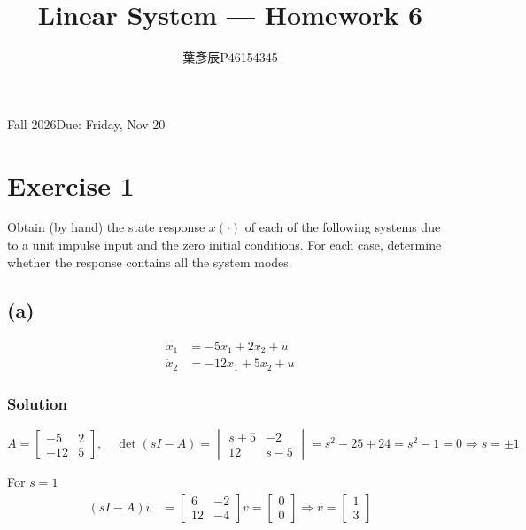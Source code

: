 \documentclass[12pt,a4paper]{article}
\title{Linear System --- Homework 6}
\author{葉彥辰\quad P46154345}
\date{}
\begin{document}
	\maketitle
	\begin{center}Fall 2026\quad Due: Friday, Nov 20\end{center}
	
	\section*{Exercise 1}
	Obtain (by hand) the state response $x(\cdot)$ of each of the following systems due to a unit impulse input and the zero initial conditions. For each case, determine whether the response contains all the system modes.
	
	\subsection*{(a)}
	\begin{align*}
		\dot{x}_{1} &= -5x_{1}+2x_{2}+u \\
		\dot{x}_{2} &= -12x_{1}+5x_{2}+u
	\end{align*}
	
	\subsubsection*{Solution}
	
	\[
	A = \begin{bmatrix}
		-5 & 2 \\ -12 & 5
	\end{bmatrix}, \quad \det (sI - A) = \begin{vmatrix}
	s + 5 & -2  \\ 12 & s - 5
	\end{vmatrix} = s^2 -25 + 24 = s^2 -1 = 0 \Rightarrow s = \pm 1
	\]
	
	For $s = 1$
	\begin{align*}
		(sI - A)v &= \begin{bmatrix}
			6 & -2 \\ 12 & -4
		\end{bmatrix}v = \begin{bmatrix}
		0\\0
		\end{bmatrix} \Rightarrow v = \begin{bmatrix}
		1 \\ 3
		\end{bmatrix}
	\end{align*}
	
\end{document}
